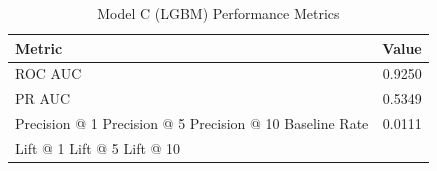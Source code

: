 \begin{table}[h]
\centering
\begin{tabular}{lr}
\toprule
Metric & Value \\
\midrule
ROC AUC & 0.9250 \\
PR AUC & 0.5349 \\
Precision @ 1%
Precision @ 5%
Precision @ 10%
Baseline Rate & 0.0111 \\
Lift @ 1%
Lift @ 5%
Lift @ 10%
\bottomrule
\end{tabular}
\caption{Model C (LGBM) Performance Metrics}
\label{tab:modelc_lgbm_metrics}
\end{table}
